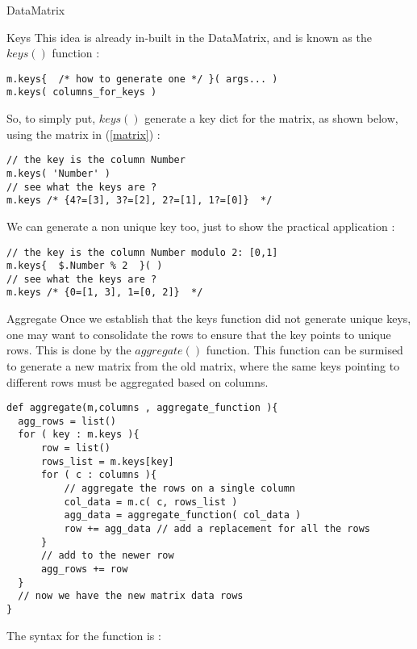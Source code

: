 \begin{section}{DataMatrix}
\begin{subsection}{Keys}
This idea is already in-built in the DataMatrix, and is known as the $keys()$ function :

\begin{lstlisting}[style=JexlStyle]
m.keys{  /* how to generate one */ }( args... )
m.keys( columns_for_keys )
\end{lstlisting}

So, to simply put, $keys()$ generate a key dict for the matrix, as shown below, 
using the  matrix in (\ref{matrix}) :  

\begin{lstlisting}[style=JexlStyle]
// the key is the column Number
m.keys( 'Number' )
// see what the keys are ?
m.keys /* {4?=[3], 3?=[2], 2?=[1], 1?=[0]}  */
\end{lstlisting}

We can generate a non unique key too, just to show the practical application :

\begin{lstlisting}[style=JexlStyle]
// the key is the column Number modulo 2: [0,1]
m.keys{  $.Number % 2  }( )
// see what the keys are ?
m.keys /* {0=[1, 3], 1=[0, 2]}  */
\end{lstlisting}

\end{subsection}

\begin{subsection}{Aggregate}
Once we establish that the keys function did not generate unique keys, one may want to 
consolidate the rows to ensure that the key points to unique rows.
This is done by the $aggregate()$ function. This function can be surmised to
generate a new matrix from the old matrix, where the same keys pointing to different rows
must be aggregated based on columns.

\begin{lstlisting}[style=JexlStyle]
def aggregate(m,columns , aggregate_function ){
  agg_rows = list()
  for ( key : m.keys ){
      row = list()
      rows_list = m.keys[key]  
      for ( c : columns ){
          // aggregate the rows on a single column
          col_data = m.c( c, rows_list ) 
          agg_data = aggregate_function( col_data )
          row += agg_data // add a replacement for all the rows   
      }
      // add to the newer row
      agg_rows += row 
  }
  // now we have the new matrix data rows
}
\end{lstlisting}

The syntax for the function is :


\end{subsection}
\end{section}
